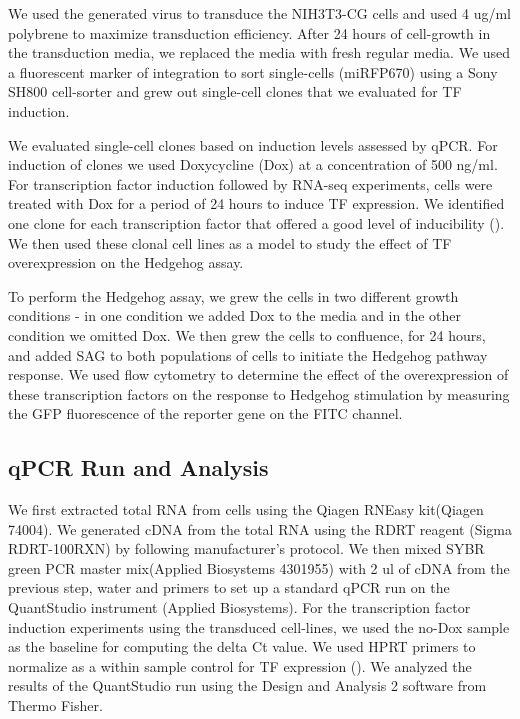 We used the generated virus to transduce the NIH3T3-CG cells and used 4 ug/ml polybrene to maximize transduction efficiency. After 24 hours of cell-growth in the transduction media, we replaced the media with fresh regular media. We used a fluorescent marker of integration to sort single-cells (miRFP670) using a Sony SH800 cell-sorter and grew out single-cell clones that we evaluated for TF induction. 

We evaluated single-cell clones based on induction levels assessed by qPCR. For induction of clones we used Doxycycline (Dox) at a concentration of 500 ng/ml. For transcription factor induction followed by RNA-seq experiments, cells were treated with Dox for a period of 24 hours to induce TF expression. We identified one clone for each transcription factor that offered a good level of inducibility (). We then used these clonal cell lines as a model to study the effect of TF overexpression on the Hedgehog assay. 

To perform the Hedgehog assay, we grew the cells in two different growth conditions - in one condition we added Dox to the media and in the other condition we omitted Dox. We then grew the cells to confluence, for 24 hours, and added SAG to both populations of cells to initiate the Hedgehog pathway response. We used flow cytometry to determine the effect of the overexpression of these transcription factors on the response to Hedgehog stimulation by measuring the GFP fluorescence of the reporter gene on the FITC channel. 

\subsection{qPCR Run and Analysis}
We first extracted total RNA from cells using the Qiagen RNEasy kit(Qiagen 74004). We generated cDNA from the total RNA using the RDRT reagent (Sigma RDRT-100RXN) by following manufacturer's protocol. We then mixed SYBR green PCR master mix(Applied Biosystems 4301955) with 2 ul of cDNA from the previous step, water and primers to set up a standard qPCR run on the QuantStudio instrument (Applied Biosystems). For the transcription factor induction experiments using the transduced cell-lines, we used the no-Dox sample as the baseline for computing the delta Ct value. We used HPRT primers to normalize as a within sample control for TF expression (). We analyzed the results of the QuantStudio run using the Design and Analysis 2 software from Thermo Fisher.

